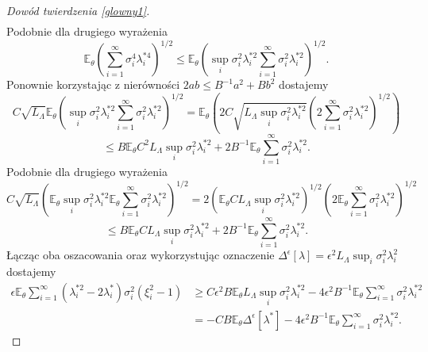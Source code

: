 \documentclass[man,mfiu]{mgrwms}
\begin{document}
\begin{proof}[Dowód twierdzenia \ref{glowny1}]
\begin{displaymath}
\begin{split}
\end{split}
\end{displaymath}
Podobnie dla drugiego wyrażenia
\begin{displaymath}
\mathbb{E}_{\theta}\left(\sum_{i=1}^{\infty}\sigma_i^4\lambda_i^{*4}\right)^{1/2}\leq \mathbb{E}_{\theta}\left(\sup_i\sigma_i^2\lambda_i^{*2}\sum_{i=1}^{\infty}\sigma_i^2\lambda_i^{*2}\right)^{1/2}.
\end{displaymath}
Ponownie korzystając z nierówności $2ab\leq B^{-1}a^2+Bb^2$ dostajemy
\begin{displaymath}
C\sqrt{L_{\Lambda}}\mathbb{E}_{\theta}\left(\sup_i\sigma_i^2\lambda_i^{*2}\sum_{i=1}^{\infty}\sigma_i^2\lambda_i^{*2}\right)^{1/2}=\mathbb{E}_{\theta}\left(2C\sqrt{L_{\Lambda}\sup_i\sigma_i^2\lambda_i^{*2}}\left(2\sum_{i=1}^{\infty}\sigma_i^2\lambda_i^{*2}\right)^{1/2}\right)
\end{displaymath}
\begin{displaymath}
\leq B\mathbb{E}_{\theta}C^2L_{\Lambda}\sup_i\sigma_i^2\lambda_i^{*2}+2B^{-1}\mathbb{E}_{\theta}\sum_{i=1}^{\infty}\sigma_i^2\lambda_i^{*2}.
\end{displaymath}
Podobnie dla drugiego wyrażenia
\begin{displaymath}
C\sqrt{L_{\Lambda}}\left(\mathbb{E}_{\theta}\sup_i\sigma_i^2\lambda_i^{*2}\mathbb{E}_{\theta}\sum_{i=1}^{\infty}\sigma_i^2\lambda_i^{*2}\right)^{1/2}=2\left(\mathbb{E}_{\theta}CL_{\Lambda}\sup_i\sigma_i^2\lambda_i^{*2}\right)^{1/2}\left(2\mathbb{E}_{\theta}\sum_{i=1}^{\infty}\sigma_i^2\lambda_i^{*2}\right)^{1/2}
\end{displaymath}
\begin{displaymath}
\leq B\mathbb{E}_{\theta}CL_{\Lambda}\sup_i\sigma_i^2\lambda_i^{*2}+2B^{-1}\mathbb{E}_{\theta}\sum_{i=1}^{\infty}\sigma_i^2\lambda_i^{*2}.
\end{displaymath}
Łącząc oba oszacowania oraz wykorzystując oznaczenie $\Delta^{\epsilon}[\lambda]=\epsilon^2L_{\Lambda}\sup_i\sigma_i^2\lambda_i^2$ dostajemy
\begin{equation}\label{szacowanie2}
\begin{split}
\epsilon\mathbb{E}_{\theta}\sum_{i=1}^{\infty}(\lambda_i^{*2}-2\lambda_i^*)\sigma_i^2(\xi_i^2-1)
&\geq C\epsilon^2 B\mathbb{E}_{\theta}L_{\Lambda}\sup_i\sigma_i^2\lambda_i^{*2}-4\epsilon^2B^{-1}\mathbb{E}_{\theta}\sum_{i=1}^{\infty}\sigma_i^2\lambda_i^{*2}\\
&=-CB\mathbb{E}_{\theta}\Delta^{\epsilon}[\lambda^*]-4\epsilon^2B^{-1}\mathbb{E}_{\theta}\sum_{i=1}^{\infty}\sigma_i^2\lambda_i^{*2}.

\end{split}
\end{equation}
\end{proof}
\end{document}
